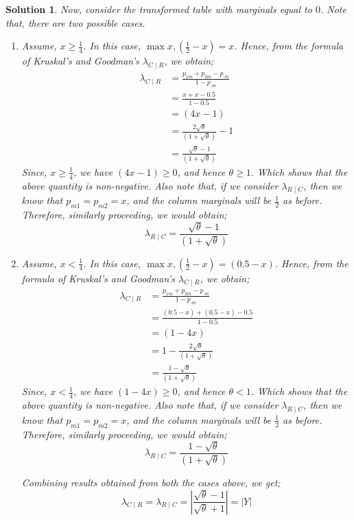 \documentclass[12pt]{article}
\theoremstyle{problemstyle}
\newtheorem{solution}{Solution}
\begin{document}
\begin{solution}
 	Now, consider the transformed table with marginals equal to $0$. Note that, there are two possible cases.
 	\begin{enumerate}[label=(\alph*),leftmargin=4\parindent]
 		\item[\textbf{Case 1:}] Assume, $x \geq \frac{1}{4}$. In this case, $\max{x, (\frac{1}{2} - x)} = x$. Hence, from the formula of Kruskal's and Goodman's $\lambda_{C\mid R}$, we obtain;
 		\begin{align*}
 			\lambda_{C\mid R} & = \frac{p_{1m} + p_{2m} - p_{\cdot m}}{1 - p_{\cdot m}}\\
 			& = \frac{x + x - 0.5}{1 - 0.5}\\
 			& = (4x - 1)\\
 			& = \frac{2\sqrt{\theta}}{(1 + \sqrt{\theta})} - 1\\
 			& = \frac{\sqrt{\theta} - 1}{(1 + \sqrt{\theta})}
 		\end{align*}
 		Since, $x \geq \frac{1}{4}$, we have $(4x - 1) \geq 0$, and hence $\theta \geq 1$. Which shows that the above quantity is non-negative. 
 		Also note that, if we consider $\lambda_{R \mid C}$, then we know that $p_{m1} = p_{m2} = x$, and the column marginals will be $\frac{1}{2}$ as before. Therefore, similarly proceeding, we would obtain;
 		$$\lambda_{R \mid C} = \frac{\sqrt{\theta} - 1}{(1 + \sqrt{\theta})}$$
 		
 		\item[\textbf{Case 2:}] Assume, $x < \frac{1}{4}$. In this case, $\max{x, (\frac{1}{2} - x)} = (0.5 - x)$. Hence, from the formula of Kruskal's and Goodman's $\lambda_{C\mid R}$, we obtain;
 		\begin{align*}
 		\lambda_{C\mid R} & = \frac{p_{1m} + p_{2m} - p_{\cdot m}}{1 - p_{\cdot m}}\\
 		& = \frac{(0.5 - x) + (0.5 - x) - 0.5}{1 - 0.5}\\
 		& = (1 - 4x)\\
 		& = 1 - \frac{2\sqrt{\theta}}{(1 + \sqrt{\theta})}\\
 		& = \frac{1 - \sqrt{\theta}}{(1 + \sqrt{\theta})}
 		\end{align*}
 		Since, $x < \frac{1}{4}$, we have $(1 - 4x) \geq 0$, and hence $\theta < 1$. Which shows that the above quantity is non-negative. 
 		Also note that, if we consider $\lambda_{R \mid C}$, then we know that $p_{m1} = p_{m2} = x$, and the column marginals will be $\frac{1}{2}$ as before. Therefore, similarly proceeding, we would obtain;
 		$$\lambda_{R \mid C} = \frac{1 - \sqrt{\theta}}{(1 + \sqrt{\theta})}$$
 		
 		Combining results obtained from both the cases above, we get;
 		$$\lambda_{C\mid R} = \lambda_{R \mid C} = \left| \frac{\sqrt{\theta} - 1}{\sqrt{\theta} + 1} \right| = \vert Y \vert$$
 	\end{enumerate}
 	
\end{solution}
\end{document}
